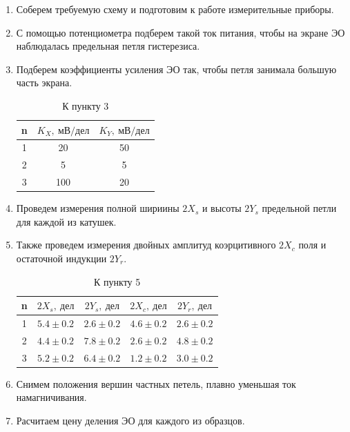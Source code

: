 \documentclass[14pt, a4paper]{report}
\begin{document}
\begin{enumerate}

\setcounter{enumi}{0}

\item Соберем требуемую схему и подготовим к работе измерительные приборы.

\item С помощью потенциометра подберем такой ток питания, чтобы на экране ЭО наблюдалась предельная петля гистерезиса.

\item Подберем коэффициенты усиления ЭО так, чтобы петля занимала большую часть экрана.

\begin{table}[h!]
\centering
\begin{tabular}{| c | c | c |}
\hline
n & $K_X,\ мВ/дел$ & $K_Y,\ мВ/дел$ \\
\hline
1 & 20 & 50 \\
2 & 5 & 5 \\
3 & 100 & 20 \\
\hline
\end{tabular}
\caption{К пункту 3}
\end{table}

\item Проведем измерения полной шириины $2X_s$ и высоты $2Y_s$ предельной петли для каждой из катушек.

\item Также проведем измерения двойных амплитуд коэрцитивного $2X_c$ поля и остаточной индукции $2Y_r$.

\begin{table}[!h]
\centering
\begin{tabular}{| c | c | c | c | c |}
\hline
n & $2X_s,\ дел$ & $2Y_s,\ дел$ & $2X_c,\ дел$ & $2Y_r,\ дел$ \\
\hline
1 & $5.4\pm0.2$ & $2.6\pm0.2$ & $4.6\pm0.2$ & $2.6\pm0.2$ \\
2 & $4.4\pm0.2$ & $7.8\pm0.2$ & $2.6\pm0.2$ & $4.8\pm0.2$ \\
3 & $5.2\pm0.2$ & $6.4\pm0.2$ & $1.2\pm0.2$ & $3.0\pm0.2$ \\
\hline
\end{tabular}
\caption{К пункту 5}
\end{table}

\item Снимем положения вершин частных петель, плавно уменьшая ток намагничивания.

\item Расчитаем цену деления ЭО для каждого из образцов.	


\end{enumerate}
\end{document}
